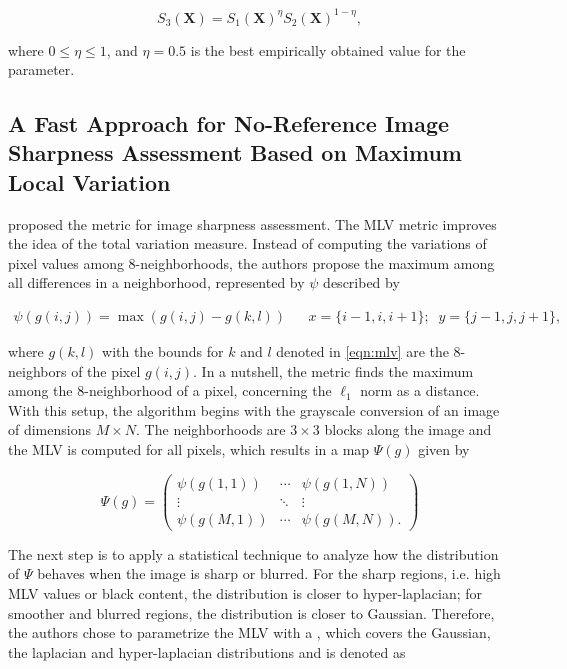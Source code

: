 \begin{equation}
\label{eqn:s3_index}
S_{3}(\mathbf{X}) = S_{1}(\mathbf{X})^{\eta} S_{2}(\mathbf{X})^{1 - \eta},
\end{equation}

\noindent where $0 \leq \eta \leq 1$, and $\eta = 0.5$ is the best empirically obtained value for the parameter.

\subsection{A Fast Approach for No-Reference Image Sharpness Assessment Based on Maximum Local Variation}

 proposed the  metric for image sharpness assessment. The MLV metric improves the idea of the total variation measure. Instead of computing the variations of pixel values among 8-neighborhoods, the authors propose the maximum among all differences in a neighborhood, represented by $\psi$ described by

\begin{align}
\label{eqn:mlv}
\psi(g(i,j)) = \max(g(i,j) - g(k,l))
&&
x = \{i - 1, i, i + 1\};\;\;
y = \{j - 1, j, j + 1\},
\end{align}

\noindent where $g(k,l)$ with the bounds for $k$ and $l$ denoted in \autoref{eqn:mlv} are the 8-neighbors of the pixel $g(i,j)$. In a nutshell, the metric finds the maximum among the 8-neighborhood of a pixel, concerning the $\ell_{1}$ norm as a distance. With this setup, the algorithm begins with the grayscale conversion of an image of dimensions $M \times N$. The neighborhoods are $3 \times 3$ blocks along the image and the MLV is computed for all pixels, which results in a map $\Psi(g)$ given by

\begin{equation}
\label{eqn:mlv_matrix}
\Psi(g) =
    \begin{pmatrix}
        \psi(g(1,1)) & \cdots &  \psi(g(1,N))\\
        \vdots & \ddots & \vdots\\
        \psi(g(M,1)) & \cdots & \psi(g(M,N)).
    \end{pmatrix}
\end{equation}

\noindent The next step is to apply a statistical technique to analyze how the distribution of $\Psi$ behaves when the image is sharp or blurred. For the sharp regions, i.e. high MLV values or black content, the distribution is closer to hyper-laplacian; for smoother and blurred regions, the distribution is closer to Gaussian. Therefore, the authors chose to parametrize the MLV with a , which covers the Gaussian, the laplacian and hyper-laplacian distributions and is denoted as


